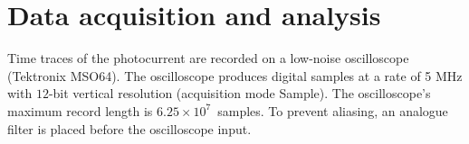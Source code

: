 \documentclass[./Main-revtex.tex]{subfiles}
\begin{document}
\section{Data acquisition and analysis}
Time traces of the photocurrent are recorded on a low-noise oscilloscope (Tektronix MSO64). The oscilloscope produces digital samples at a rate of 5 MHz with $12$-bit vertical resolution (acquisition mode Sample). The oscilloscope's maximum record length is $6.25\times10^7$~samples. To prevent aliasing, an analogue filter is placed before the oscilloscope input.

\ifSubfilesClassLoaded{%
    
}{%
}
\end{document}
